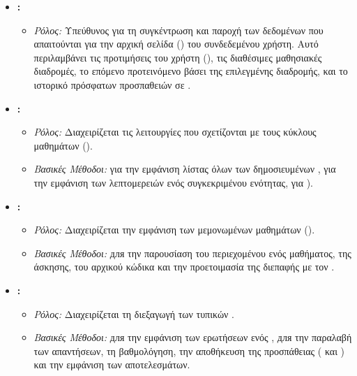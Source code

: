 \begin{itemize}[leftmargin=*, noitemsep]
    \item \textbf{\texttt{}:}
        \begin{itemize}[leftmargin=+, noitemsep]
            \item \textit{Ρόλος:} Υπεύθυνος για τη συγκέντρωση και παροχή των δεδομένων που απαιτούνται για την αρχική σελίδα () του συνδεδεμένου χρήστη. Αυτό περιλαμβάνει τις προτιμήσεις του χρήστη (), τις διαθέσιμες μαθησιακές διαδρομές, το επόμενο προτεινόμενο  βάσει της επιλεγμένης διαδρομής, και το ιστορικό πρόσφατων προσπαθειών σε .
        \end{itemize}
    \item \textbf{\texttt{}:}
        \begin{itemize}[leftmargin=+, noitemsep]
            \item \textit{Ρόλος:} Διαχειρίζεται τις λειτουργίες που σχετίζονται με τους κύκλους μαθημάτων ().
            \item \textit{Βασικές Μέθοδοι:} \texttt{} για την εμφάνιση λίστας όλων των δημοσιευμένων , \texttt{} για την εμφάνιση των λεπτομερειών ενός συγκεκριμένου  ενότητας,  για ).
        \end{itemize}
    \item \textbf{\texttt{}:}
        \begin{itemize}[leftmargin=+, noitemsep]
            \item \textit{Ρόλος:} Διαχειρίζεται την εμφάνιση των μεμονωμένων μαθημάτων ().
            \item \textit{Βασικές Μέθοδοι:} \texttt{} для την παρουσίαση του περιεχομένου ενός μαθήματος, της άσκησης, του αρχικού κώδικα και την προετοιμασία της διεπαφής με τον .
        \end{itemize}
    \item \textbf{\texttt{}:}
        \begin{itemize}[leftmargin=+, noitemsep]
            \item \textit{Ρόλος:} Διαχειρίζεται τη διεξαγωγή των τυπικών .
            \item \textit{Βασικές Μέθοδοι:} \texttt{} для την εμφάνιση των ερωτήσεων ενός , \texttt{} для την παραλαβή των απαντήσεων, τη βαθμολόγηση, την αποθήκευση της προσπάθειας ( και ) και την εμφάνιση των αποτελεσμάτων.

\end{itemize}
\end{itemize}
